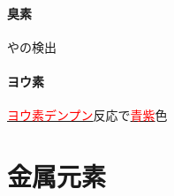 \documentclass[dvipdfmx,a4paper,twocolumn]{jsarticle}
\newcommand{\hl}[1]{\underline{\textcolor{red}{\gtfamily #1}}}
\begin{document}
  \subsection{臭素 }
  やの検出
  
  \subsection{ヨウ素 }
  \hl{ヨウ素デンプン}反応で\hl{青紫}色
 \newpage
 \part{金属元素}
\end{document}
